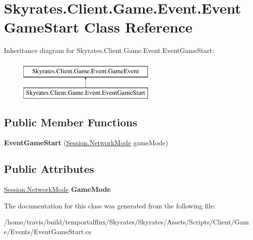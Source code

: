 \hypertarget{class_skyrates_1_1_client_1_1_game_1_1_event_1_1_event_game_start}{\section{Skyrates.\-Client.\-Game.\-Event.\-Event\-Game\-Start Class Reference}
\label{class_skyrates_1_1_client_1_1_game_1_1_event_1_1_event_game_start}
}
Inheritance diagram for Skyrates.\-Client.\-Game.\-Event.\-Event\-Game\-Start\-:\begin{figure}[H]
\begin{center}
\leavevmode
\includegraphics[height=2.000000cm]{class_skyrates_1_1_client_1_1_game_1_1_event_1_1_event_game_start}
\end{center}
\end{figure}
\subsection*{Public Member Functions}
\begin{DoxyCompactItemize}
\item 
\hypertarget{class_skyrates_1_1_client_1_1_game_1_1_event_1_1_event_game_start_ab52f3ae4fc5b6a2d89e92599b635d425}{{\bfseries Event\-Game\-Start} (\hyperlink{class_skyrates_1_1_common_1_1_network_1_1_session_ad2f4973bc77af540bd68a428e349fbff}{Session.\-Network\-Mode} game\-Mode)}\label{class_skyrates_1_1_client_1_1_game_1_1_event_1_1_event_game_start_ab52f3ae4fc5b6a2d89e92599b635d425}

\end{DoxyCompactItemize}
\subsection*{Public Attributes}
\begin{DoxyCompactItemize}
\item 
\hypertarget{class_skyrates_1_1_client_1_1_game_1_1_event_1_1_event_game_start_ad45d0af9906a79fd939914ce8bcf8b57}{\hyperlink{class_skyrates_1_1_common_1_1_network_1_1_session_ad2f4973bc77af540bd68a428e349fbff}{Session.\-Network\-Mode} {\bfseries Game\-Mode}}\label{class_skyrates_1_1_client_1_1_game_1_1_event_1_1_event_game_start_ad45d0af9906a79fd939914ce8bcf8b57}

\end{DoxyCompactItemize}


The documentation for this class was generated from the following file\-:\begin{DoxyCompactItemize}
\item 
/home/travis/build/temportalflux/\-Skyrates/\-Skyrates/\-Assets/\-Scripts/\-Client/\-Game/\-Events/Event\-Game\-Start.\-cs\end{DoxyCompactItemize}
